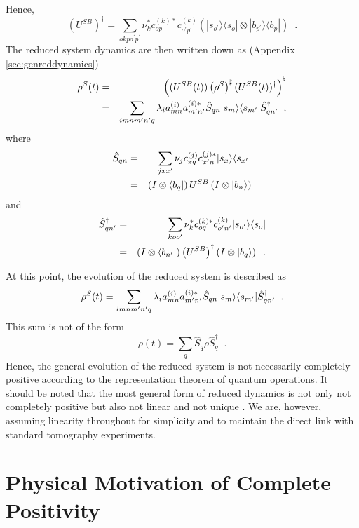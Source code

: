 Hence,
$$
\left(U^{SB}\right)^\dagger = \sum_{okpo^\prime p^\prime} \nu_k^* c_{op}^{(k)*}c_{o^\prime p^\prime}^{(k)} \left(|s_{o^\prime} \rangle\langle s_{o} | \otimes |b_{p^\prime} \rangle\langle b_{p} |\right)\;\;.
$$
The reduced system dynamics are then written down as (Appendix \ref{sec:genreddynamics})
\begin{eqnarray*}
\rho^S (t) &=& \left((U^{SB}(t))\left(\rho^{S}\right)^\sharp(U^{SB}(t))^\dagger\right)^\flat  \\
&=& \sum_{imnm^\prime n^\prime q} \lambda_i a_{mn}^{(i)} a_{m^\prime n^\prime}^{(i)*} \hat{S}_{qn} |s_m\rangle\langle s_{m^\prime}| \hat{S}_{qn^\prime}^\dagger\;\;,
\end{eqnarray*}
where
\begin{eqnarray}
\label{eqn:formalS}
\hat{S}_{qn} &=& \sum_{jxx^\prime} \nu_j c_{xq}^{(j)} c_{x^\prime n}^{(j)*} |s_x\rangle\langle s_{x^\prime}|\\
&=& \left( I\otimes \left\langle b_q\right|\right)U^{SB}\left(I\otimes \left|b_n\right\rangle\right)
\end{eqnarray}
and
\begin{eqnarray*}
\hat{S}_{qn^\prime}^\dagger &=& \sum_{koo^\prime} \nu_k^* c_{oq}^{(k)*} c_{o^\prime n^\prime}^{(k)} |s_{o^\prime}\rangle\langle s_{o}|\\
&=& \left( I\otimes \left\langle b_{n^\prime}\right|\right)\left(U^{SB}\right)^\dagger\left(I\otimes \left|b_q\right\rangle\right)\;\;.
\end{eqnarray*}

At this point, the evolution of the reduced system is described as
\begin{equation}
\label{eqn:gensumeqn}
\rho^S(t) = \sum_{imnm^\prime n^\prime q} \lambda_i a_{mn}^{(i)} a_{m^\prime n^\prime}^{(i)*} \hat{S}_{qn} |s_m\rangle\langle s_{m^\prime}| \hat{S}_{qn^\prime}^\dagger\;\;.
\end{equation}
This sum is not of the form 
$$
\rho(t) = \sum_q \hat{S}_q \rho \hat{S}_q^\dagger\;\;.
$$
Hence, the general evolution of the reduced system is not necessarily completely positive according to the representation theorem of quantum operations.  It should be noted that the most general form of reduced dynamics is not only not completely positive but also not linear and not unique \cite{Lendi2000,Carteret2008}.  We are, however, assuming linearity throughout for simplicity and to maintain the direct link with standard tomography experiments.   

\section{Physical Motivation of Complete Positivity}
\label{sec:physmot}


